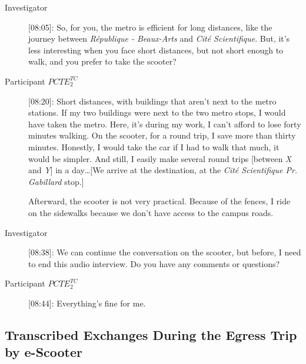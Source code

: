 \begin{description}
    \item[Investigator] [08:05]: So, for you, the metro is efficient for long distances, like the journey between \textsl{République - Beaux-Arts} and \textsl{Cité Scientifique}. But, it’s less interesting when you face short distances, but not short enough to walk, and you prefer to take the scooter?
    \item[Participant \(PCTE^{TC}_{2}\)] [08:20]: Short distances, with buildings that aren’t next to the metro stations. If my two buildings were next to the two metro stops, I would have taken the metro. Here, it’s during my work, I can’t afford to lose forty minutes walking. On the scooter, for a round trip, I save more than thirty minutes. Honestly, I would take the car if I had to walk that much, it would be simpler. And still, I easily make several round trips [between \textsl{X} and \textsl{Y}] in a day\dots [We arrive at the destination, at the \textsl{Cité Scientifique Pr. Gabillard} stop.]%

    Afterward, the scooter is not very practical. Because of the fences, I ride on the sidewalks because we don’t have access to the campus roads.
    \item[Investigator] [08:38]: We can continue the conversation on the scooter, but before, I need to end this audio interview. Do you have any comments or questions?
    \item[Participant \(PCTE^{TC}_{2}\)] [08:44]: Everything’s fine for me.%
\end{description}

\subsection{Transcribed Exchanges During the Egress Trip by e-Scooter}

